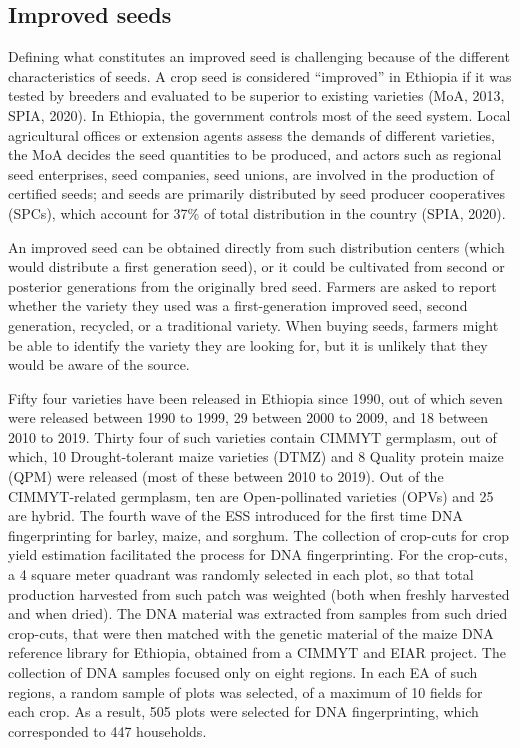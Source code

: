 \documentclass{article}
\begin{document}
\subsection{Improved seeds}

Defining what constitutes an improved seed is challenging because of the different characteristics of seeds. A crop seed is considered “improved” in Ethiopia if it was tested by breeders and evaluated to be superior to existing varieties (MoA, 2013, SPIA, 2020). In Ethiopia, the government controls most of the seed system. Local agricultural offices or extension agents assess the demands of different varieties, the MoA decides the seed quantities to be produced, and actors such as regional seed enterprises, seed companies, seed unions, are involved in the production of certified seeds; and seeds are primarily distributed by seed producer cooperatives (SPCs), which account for 37\% of total distribution in the country (SPIA, 2020). 

An improved seed can be obtained directly from such distribution centers (which would distribute a first generation seed), or it could be cultivated from second or posterior generations from the originally bred seed. Farmers are asked to report whether the variety they used was a first-generation improved seed, second generation,  recycled, or a traditional variety. When buying seeds, farmers might be able to identify the variety they are looking for, but it is unlikely that they would be aware of the source. 

Fifty four varieties have been released in Ethiopia since 1990, out of which seven were released between 1990 to 1999, 29 between 2000 to 2009, and 18 between 2010 to 2019. Thirty four of such varieties contain CIMMYT germplasm, out of which, 10 Drought-tolerant maize varieties (DTMZ) and 8 Quality protein maize (QPM) were released (most of these between 2010 to 2019). Out of the CIMMYT-related germplasm, ten are Open-pollinated varieties (OPVs) and 25 are hybrid. 
The fourth wave of the ESS introduced for the first time DNA fingerprinting for barley, maize, and sorghum. The collection of crop-cuts for crop yield estimation facilitated the process for DNA fingerprinting. For the crop-cuts, a 4 square meter quadrant was randomly selected in each plot, so that total production harvested from such patch was weighted (both when freshly harvested and when dried). The DNA material was extracted from samples from such dried crop-cuts, that were then matched with the genetic material of the maize DNA reference library for Ethiopia, obtained from a CIMMYT and EIAR project. The collection of DNA samples focused only on eight regions. In each EA of such regions, a random sample of plots was selected, of a maximum of 10 fields for each crop. As a result, 505 plots were selected for DNA fingerprinting, which corresponded to 447 households. 
\end{document}
